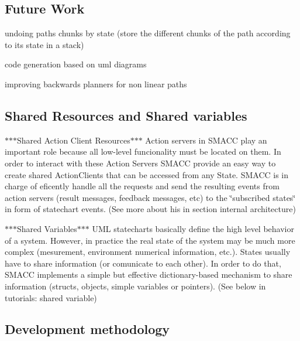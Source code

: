 \subsection*{Future Work}


\begin{DoxyItemize}
\item undoing paths chunks by state (store the different chunks of the path according to its state in a stack)
\item code generation based on uml diagrams
\item improving backwards planners for non linear paths
\end{DoxyItemize}

\subsection*{Shared Resources and Shared variables}


\begin{DoxyItemize}
\item $\ast$$\ast$$\ast$\-Shared Action Client Resources$\ast$$\ast$$\ast$ Action servers in S\-M\-A\-C\-C play an important role because all low-\/level funcionality must be located on them. In order to interact with these Action Servers S\-M\-A\-C\-C provide an easy way to create shared Action\-Clients that can be accessed from any State. S\-M\-A\-C\-C is in charge of eficently handle all the requests and send the resulting events from action servers (result messages, feedback messages, etc) to the \char`\"{}subscribed states\char`\"{} in form of statechart events. (See more about his in section internal architecture)
\item $\ast$$\ast$$\ast$\-Shared Variables$\ast$$\ast$$\ast$ U\-M\-L statecharts basically define the high level behavior of a system. However, in practice the real state of the system may be much more complex (mesurement, environment numerical information, etc.). States usually have to share information (or comunicate to each other). In order to do that, S\-M\-A\-C\-C implements a simple but effective dictionary-\/based mechanism to share information (structs, objects, simple variables or pointers). (See below in tutorials\-: shared variable) 
\end{DoxyItemize}

 

\subsection*{Development methodology}

